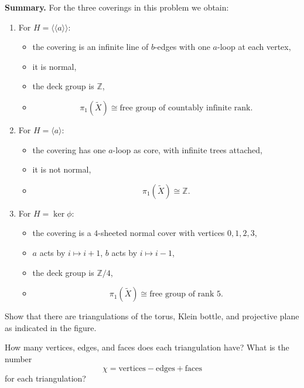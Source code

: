 \begin{solution}
\par

\textbf{Summary.}
For the three coverings in this problem we obtain:

\begin{enumerate}
	\item[(i)] For \(H=\langle\!\langle a\rangle\!\rangle\):
	\begin{itemize}
		\item the covering is an infinite line of \(b\)-edges with one \(a\)-loop at each vertex,
		\item it is normal,
		\item the deck group is \(\mathbb Z\),
		\item
		\[
		\pi_1(\widetilde X)\cong \text{free group of countably infinite rank}.
		\]
	\end{itemize}

	\item[(ii)] For \(H=\langle a\rangle\):
	\begin{itemize}
		\item the covering has one \(a\)-loop as core, with infinite trees attached,
		\item it is not normal,
		\item
		\[
		\pi_1(\widetilde X)\cong \mathbb Z.
		\]
	\end{itemize}

	\item[(iii)] For \(H=\ker\phi\):
	\begin{itemize}
		\item the covering is a \(4\)-sheeted normal cover with vertices \(0,1,2,3\),
		\item \(a\) acts by \(i\mapsto i+1\), \(b\) acts by \(i\mapsto i-1\),
		\item the deck group is \(\mathbb Z/4\),
		\item
		\[
		\pi_1(\widetilde X)\cong \text{free group of rank }5.
		\]
	\end{itemize}
\end{enumerate}
\end{solution}

\begin{problem}
Show that there are triangulations of the torus, Klein bottle, and projective plane as indicated in the figure.

How many vertices, edges, and faces does each triangulation have? What is the number
\[
\chi = \text{vertices} - \text{edges} + \text{faces}
\]
for each triangulation?
\end{problem}


